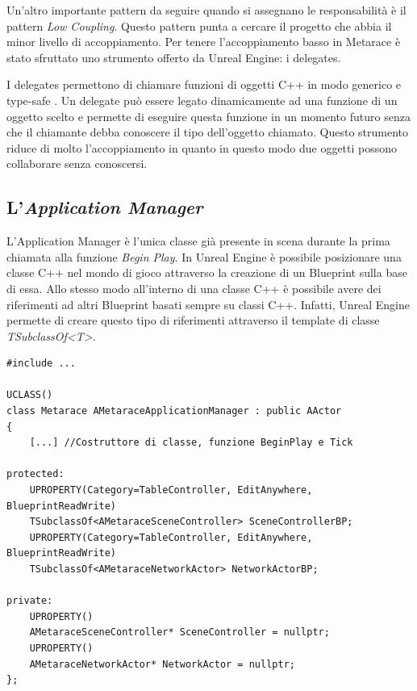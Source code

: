     Un'altro importante pattern da seguire quando si assegnano le responsabilità è il pattern \textit{Low Coupling}.
    Questo pattern punta a cercare il progetto che abbia il minor livello di accoppiamento.
    Per tenere l'accoppiamento basso in Metarace è stato sfruttato uno strumento offerto da Unreal Engine: i delegates.

    I delegates permettono di chiamare funzioni di oggetti C++ in modo generico e type-safe \cite{UDelegates}.
    Un delegate può essere legato dinamicamente ad una funzione di un oggetto scelto e permette di eseguire questa funzione in un momento futuro senza che il chiamante debba conoscere il tipo dell'oggetto chiamato.
    Questo strumento riduce di molto l'accoppiamento in quanto in questo modo due oggetti possono collaborare senza conoscersi.

    \subsection{L'\textit{Application Manager}}

    L'Application Manager è l'unica classe già presente in scena durante la prima chiamata alla funzione \textit{Begin Play}.
    In Unreal Engine è possibile posizionare una classe C++ nel mondo di gioco attraverso la creazione di un Blueprint sulla base di essa.
    Allo stesso modo all'interno di una classe C++ è possibile avere dei riferimenti ad altri Blueprint basati sempre su classi C++.
    Infatti, Unreal Engine permette di creare questo tipo di riferimenti attraverso il template di classe \textit{TSubclassOf<T>}.

    \begin{lstlisting}[caption = Sezione dell'header file della classe ApplicationManager dove vengono referenziate altri Blueprint basati su classi C++]
#include ...

UCLASS()
class Metarace AMetaraceApplicationManager : public AActor
{
    [...] //Costruttore di classe, funzione BeginPlay e Tick

protected:
    UPROPERTY(Category=TableController, EditAnywhere, BlueprintReadWrite)
    TSubclassOf<AMetaraceSceneController> SceneControllerBP;
    UPROPERTY(Category=TableController, EditAnywhere, BlueprintReadWrite)
    TSubclassOf<AMetaraceNetworkActor> NetworkActorBP;

private:
    UPROPERTY()
    AMetaraceSceneController* SceneController = nullptr;
    UPROPERTY()
    AMetaraceNetworkActor* NetworkActor = nullptr;
};        
    \end{lstlisting}


